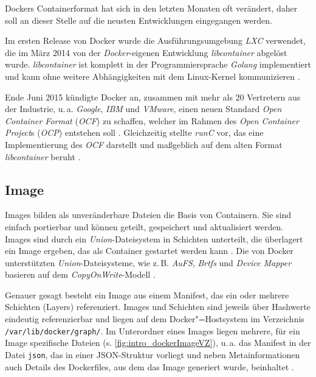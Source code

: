 \documentclass[../main.tex]{subfiles}
\begin{document}
			Dockers Containerformat hat sich in den letzten Monaten oft verändert, daher soll an dieser Stelle auf die neusten Entwicklungen eingegangen werden.

			Im ersten Release von Docker wurde die Ausführungsumgebung \emph{LXC} verwendet, die im März 2014 von der \emph{Docker}-eigenen Entwicklung \emph{libcontainer} abgelöst wurde. \emph{libcontainer} ist komplett in der Programmiersprache \emph{Golang} implementiert und kann ohne weitere Abhängigkeiten mit dem Linux-Kernel kommunizieren \cite{dockerLibcontainer}.

			Ende Juni 2015 kündigte Docker an, zusammen mit mehr als 20 Vertretern aus der Industrie, u.\,a. \emph{Google}, \emph{IBM} und \emph{VMware}, einen neuen Standard \emph{Open Container Format} (\emph{\acrshort{OCF}}) zu schaffen, welcher im Rahmen des \emph{Open Container Project}s (\emph{\acrshort{OCP}}) entstehen soll \cite{dockerOCP}. Gleichzeitig stellte \emph{\acrshort{runC}} vor, das eine Implementierung des \emph{OCF} darstellt und maßgeblich auf dem alten Format \emph{libcontainer} beruht \cite{dockerRunC}\cite{dockerRunCGithub}\cite{runC}.

		\subsection{Image}
    \label{dockerImages}
			Images bilden als unveränderbare Dateien die Basis von Containern. Sie sind einfach portierbar und können geteilt, gespeichert und aktualisiert werden. Images sind durch ein \emph{Union}-Dateisystem in Schichten unterteilt, die überlagert ein Image ergeben, das als Container gestartet werden kann \cite[S.11]{dockerBook}. Die von Docker unterstützten \emph{Union}-Dateisysteme, wie z.\,B. \emph{AuFS}, \emph{Brtfs} und \emph{Device Mapper} basieren auf dem \emph{\gls{CopyOnWrite}}-Modell \cite[S.8]{dockerBook}\cite[S.3]{dockerIntroIEEE}\cite[S.4]{dockerSecIntro}.

			Genauer gesagt besteht ein Image aus einem Manifest, das ein oder mehrere Schichten (Layers) referenziert. Images und Schichten sind jeweils über Hashwerte eindeutig referenzierbar und liegen auf dem Docker"=Hostsystem im Verzeichnis \texttt{/var/lib/docker/graph/}. Im Unterordner eines Images liegen mehrere, für ein Image spezifische Dateien (s. \fig \ref{fig:intro_dockerImageVZ}), u.\,a. das Manifest in der Datei \texttt{json}, das in einer \acrshort{JSON}-Struktur vorliegt und neben Metainformationen auch Details des Dockerfiles, aus dem das Image generiert wurde, beinhaltet \cite{githubDockerGlossary}.
\end{document}
